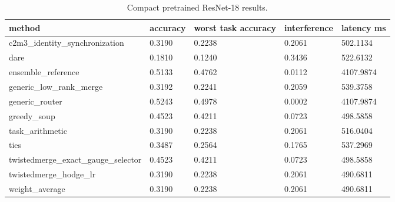 \begin{table}[t]
\centering
\caption{Compact pretrained ResNet-18 results.}
\begin{tabular}{lllll}
\toprule
method & accuracy & worst task accuracy & interference & latency ms \\
\midrule
c2m3\_identity\_synchronization & 0.3190 & 0.2238 & 0.2061 & 502.1134 \\
dare & 0.1810 & 0.1240 & 0.3436 & 522.6132 \\
ensemble\_reference & 0.5133 & 0.4762 & 0.0112 & 4107.9874 \\
generic\_low\_rank\_merge & 0.3192 & 0.2241 & 0.2059 & 539.3758 \\
generic\_router & 0.5243 & 0.4978 & 0.0002 & 4107.9874 \\
greedy\_soup & 0.4523 & 0.4211 & 0.0723 & 498.5858 \\
task\_arithmetic & 0.3190 & 0.2238 & 0.2061 & 516.0404 \\
ties & 0.3487 & 0.2564 & 0.1765 & 537.2969 \\
twistedmerge\_exact\_gauge\_selector & 0.4523 & 0.4211 & 0.0723 & 498.5858 \\
twistedmerge\_hodge\_lr & 0.3190 & 0.2238 & 0.2061 & 490.6811 \\
weight\_average & 0.3190 & 0.2238 & 0.2061 & 490.6811 \\
\bottomrule
\end{tabular}
\end{table}
